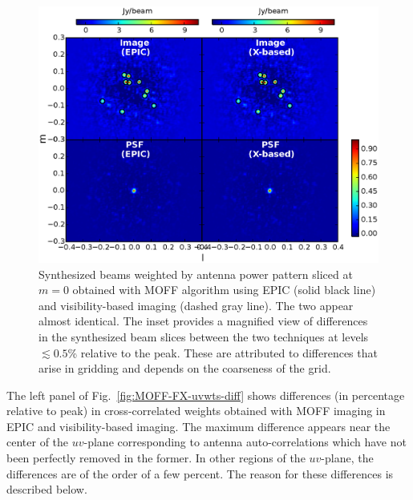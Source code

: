 \documentclass[a4paper,fleqn,usenatbib]{mnras}
\begin{document}
\begin{figure}
  \includegraphics[width=\columnwidth]{figure6}
  \caption{Synthesized beams weighted by antenna power pattern sliced at $m=0$ obtained with MOFF algorithm using EPIC (solid black line) and visibility-based imaging (dashed gray line). The two appear almost identical. The inset provides a magnified view of differences in the synthesized beam slices between the two techniques at levels $\lesssim 0.5$\% relative to the peak. These are attributed to differences that arise in gridding and depends on the coarseness of the grid.}
  \label{fig:MOFF-FX-psf-diff}
\end{figure}

The left panel of Fig.~\ref{fig:MOFF-FX-uvwts-diff} shows differences (in percentage relative to peak) in cross-correlated weights obtained with MOFF imaging in EPIC and visibility-based imaging. The maximum difference appears near the center of the $uv$-plane corresponding to antenna auto-correlations which have not been perfectly removed in the former. In other regions of the $uv$-plane, the differences are of the order of a few percent. The reason for these differences is described below.
\end{document}
